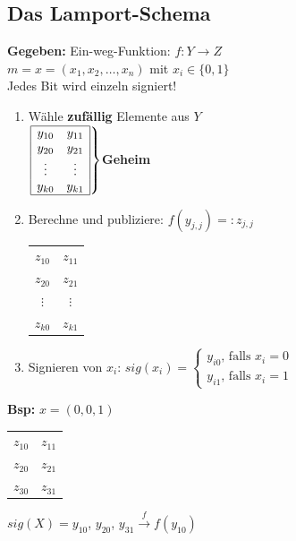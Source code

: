 \documentclass[landscape,twocolumn,a4paper]{article}
\newcommand{\Bold}[1]{\textbf{#1}} %
\newcommand{\T}[1]{\text{#1}} %
\newcommand{\Brackal}[2]{\left\lbrace\begin{array}{#1} #2 \end{array}\right.} %
\newcommand{\Brackar}[2]{\left.\begin{array}{#1} #2 \end{array}\right\rbrace} %
\newcommand{\Oben}[2]{\overset{#1}{#2}} %
\begin{document}
\subsection{Das Lamport-Schema}
 \Bold{Gegeben:} Ein-weg-Funktion: $f:Y\to Z$\\
 $m=x=(x_1,x_2,\dots,x_n)$ mit $x_i\in\{0,1\}$\\
 Jedes Bit wird einzeln signiert!
 \begin{enumerate}
  \item Wähle \Bold{zufällig} Elemente aus $Y$\\
  $\Brackar{|cc|}{\hline
   y_{10}&y_{11}\\
   y_{20}&y_{21}\\
   \vdots&\vdots\\
   y_{k0}&y_{k1}\\\hline
  }$\Bold{Geheim}
  \item Berechne und publiziere: $f(y_{j,j})=:z_{j,j}$\\
  \begin{tabular}{|cc|}\hline
   $z_{10}$&$z_{11}$\\
   $z_{20}$&$z_{21}$\\
   $\vdots$&$\vdots$\\
   $z_{k0}$&$z_{k1}$\\\hline
  \end{tabular}
  \item Signieren von $x_i$: $sig(x_i)=\Brackal{c}{y_{i0}\T{, falls }x_i=0\\y_{i1}\T{, falls }x_i=1}$
 \end{enumerate}
 \Bold{Bsp:} $x=(0,0,1)$
   \begin{tabular}{|cc|}\hline
   $z_{10}$&$z_{11}$\\
   $z_{20}$&$z_{21}$\\
   $z_{30}$&$z_{31}$\\\hline
  \end{tabular}
  $sig(X)=y_{10}$, $y_{20}$, $y_{31}\Oben{f}{\to}f(y_{10})$
\end{document}
